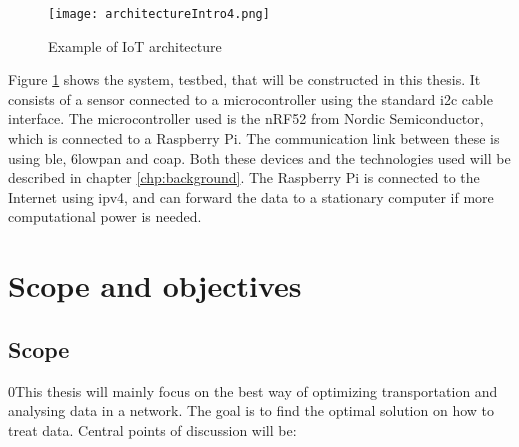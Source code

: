 \begin{figure}[ht]
    \centering
    \texttt{[image: architectureIntro4.png]}    
    \caption{Example of IoT architecture}
    \label{iotExampleArchitecture}
\end{figure}

\noindent Figure \ref{iotExampleArchitecture} shows the system, testbed, that will be constructed in this thesis. It consists of a sensor connected to a \gls{microcontroller} using the standard \gls{i2c} cable interface. The \gls{microcontroller} used is the \gls{nRF52} from Nordic Semiconductor, which is connected to a \gls{Raspberry Pi}. The communication link between these is using \gls{ble}, \gls{6lowpan} and \gls{coap}. Both these devices and the technologies used will be described in chapter \ref{chp:background}. The \gls{Raspberry Pi} is connected to the Internet using \gls{ipv4}, and can forward the data to a stationary computer if more computational power is needed. 












\section{Scope and objectives}

\subsection{Scope}

0\noindent This thesis will mainly focus on the best way of optimizing transportation and analysing data in a network. The goal is to find the optimal solution on how to treat data. Central points of discussion will be:

